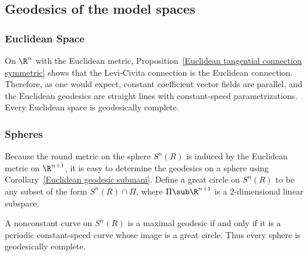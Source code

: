 \subsection{Geodesics of the model spaces}
\subsubsection{Euclidean Space}
On $\R^n$ with the Euclidean metric, Proposition~\ref{Euclidean tangential connection symmetric} shows that the Levi-Civita connection is the Euclidean connection. 
Therefore, as one would expect, constant coefficient vector fields are parallel, and the Euclidean geodesics are straight lines with constant-speed parametrizations. 
Every Euclidean space is geodesically complete.
\subsubsection{Spheres}
Because the round metric on the sphere $S^n(R)$ is induced by the Euclidean metric on $\R^{n+1}$, it is easy to determine the geodesics on a sphere using 
Corollary~\ref{Euclidean geodesic submani}. Define a great circle on $S^n(R)$ to be any subset of the form $S^n(R)\cap\Pi$, where $\Pi\sub\R^{n+1}$ is a 
$2$-dimensional linear subspace.
\begin{proposition}
A nonconstant curve on $S^n(R)$ is a maximal geodesic if and only if it is a periodic constant-speed curve whose image is a great circle. Thus every sphere is geodesically complete.
\end{proposition}
